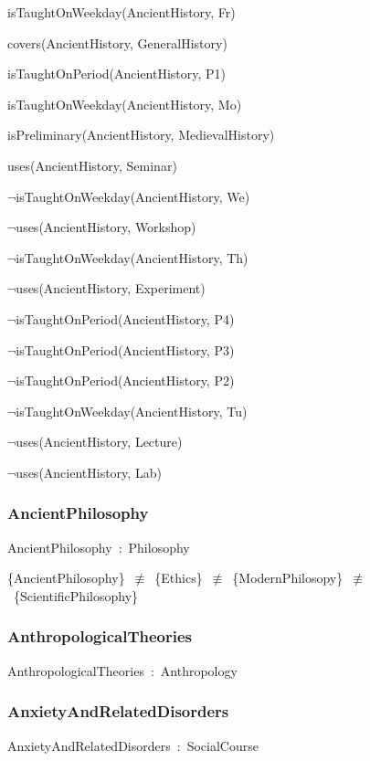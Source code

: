 \documentclass{article}
\begin{document}
isTaughtOnWeekday(AncientHistory, Fr)

covers(AncientHistory, GeneralHistory)

isTaughtOnPeriod(AncientHistory, P1)

isTaughtOnWeekday(AncientHistory, Mo)

isPreliminary(AncientHistory, MedievalHistory)

uses(AncientHistory, Seminar)

\ensuremath{\lnot}isTaughtOnWeekday(AncientHistory, We)

\ensuremath{\lnot}uses(AncientHistory, Workshop)

\ensuremath{\lnot}isTaughtOnWeekday(AncientHistory, Th)

\ensuremath{\lnot}uses(AncientHistory, Experiment)

\ensuremath{\lnot}isTaughtOnPeriod(AncientHistory, P4)

\ensuremath{\lnot}isTaughtOnPeriod(AncientHistory, P3)

\ensuremath{\lnot}isTaughtOnPeriod(AncientHistory, P2)

\ensuremath{\lnot}isTaughtOnWeekday(AncientHistory, Tu)

\ensuremath{\lnot}uses(AncientHistory, Lecture)

\ensuremath{\lnot}uses(AncientHistory, Lab)

\subsubsection*{AncientPhilosophy}

AncientPhilosophy~:~Philosophy

\{AncientPhilosophy\}~\ensuremath{\not\equiv}~\{Ethics\}~\ensuremath{\not\equiv}~\{ModernPhilosopy\}~\ensuremath{\not\equiv}~\{ScientificPhilosophy\}

\subsubsection*{AnthropologicalTheories}

AnthropologicalTheories~:~Anthropology

\subsubsection*{AnxietyAndRelatedDisorders}

AnxietyAndRelatedDisorders~:~SocialCourse
\end{document}
